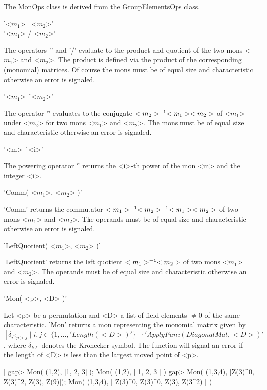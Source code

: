 
The MonOps class is derived from the GroupElementsOps class.

\bigskip
'<$m_1$> \*\ <$m_2$>'\\
'<$m_1$> / <$m_2$>'

The operators  '\*' and '/' evaluate to the product and quotient of  the
two mons <$m_1$> and <$m_2$>. The product is defined via the product of 
the corresponding (monomial) matrices. Of course the mons must be of
equal size and characteristic otherwise an error is signaled.

\bigskip
'<$m_1$> \^\ <$m_2$>'%

The operator '\^' evaluates to the conjugate 
$<m_2>^{-1}\* <m_1>\* <m_2>$  of
<$m_1$> under <$m_2$> for two mons <$m_1$> and <$m_2$>. 
The mons must be of equal size and characteristic 
otherwise an error is signaled.

\bigskip
'<m> \^\ <i>'%

The powering operator  '\^' returns the  <i>-th power  of the mon
<m> and the integer <i>. 

\bigskip
'Comm( <$m_1$>, <$m_2$> )'%

'Comm'  returns the commutator 
$<m_1>^{-1}\*  <m_2>^{-1}\* <m_1>\*<m_2>$ of two
mons <$m_1$> and <$m_2$>. The operands must be of equal size
and characteristic otherwise an error is signaled.

\bigskip
'LeftQuotient( <$m_1$>, <$m_2$> )'%

'LeftQuotient' returns the  left quotient $<m_1>^{-1}\*<m_2>$ of two 
mons <$m_1$> and <$m_2$>. The operands must be of equal size
and characteristic otherwise an error is signaled.


'Mon( <p>, <D> )'

Let <p> be a permutation and <D> a list of field elements $\neq 0$ of
the same characteristic. 'Mon' returns a mon representing the
monomial matrix given by 
$[\delta_{i^<p>j}\mid i,j\in\{1,\dots,'Length( <D> )'\}]\cdot 
'ApplyFunc(DiagonalMat, <D> )'$, where $\delta_{k\ell}$ denotes the 
Kronecker symbol. The function will signal an error if 
the length of <D> is less than the largest moved point of <p>.

|    gap> Mon( (1,2), [1, 2, 3] );
    Mon(
      (1,2),
      [ 1, 2, 3 ]
    )
    gap> Mon( (1,3,4), [Z(3)^0, Z(3)^2, Z(3), Z(9)]);
    Mon(
      (1,3,4),
      [ Z(3)^0, Z(3)^0, Z(3), Z(3^2) ]
    ) |

